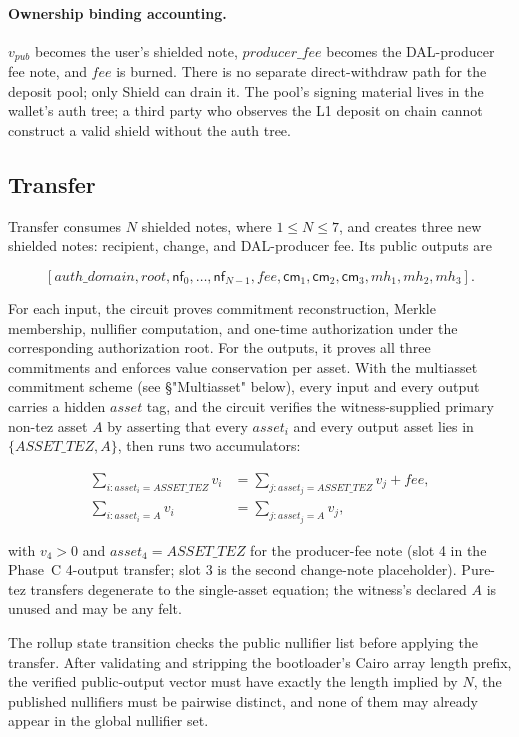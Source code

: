 \documentclass[11pt]{article}
\newcommand{\cm}{\mathsf{cm}}
\newcommand{\nf}{\mathsf{nf}}
\begin{document}
\paragraph{Ownership binding accounting.} \(v_{pub}\) becomes the user's
shielded note, \(producer\_fee\) becomes the DAL-producer fee note, and
\(fee\) is burned. There is no separate direct-withdraw path for the
deposit pool; only Shield can drain it. The pool's signing material
lives in the wallet's auth tree; a third party who observes the L1
deposit on chain cannot construct a valid shield without the auth tree.

\subsection{Transfer}

Transfer consumes \(N\) shielded notes, where \(1 \leq N \leq 7\), and creates
three new shielded notes: recipient, change, and DAL-producer fee. Its public
outputs are

\[
[auth\_domain, root, \nf_0, \ldots, \nf_{N-1}, fee,
 \cm_1, \cm_2, \cm_3, mh_1, mh_2, mh_3].
\]

For each input, the circuit proves commitment reconstruction, Merkle membership,
nullifier computation, and one-time authorization under the corresponding
authorization root. For the outputs, it proves all three commitments and
enforces value conservation per asset. With the multiasset commitment scheme
(see §"Multiasset" below), every input and every output carries a hidden
\(asset\) tag, and the circuit verifies the witness-supplied primary non-tez
asset \(A\) by asserting that every \(asset_i\) and every output asset lies
in \(\{ASSET\_TEZ, A\}\), then runs two accumulators:

\begin{align*}
\sum_{i : asset_i = ASSET\_TEZ} v_i &= \sum_{j : asset_j = ASSET\_TEZ} v_j + fee, \\
\sum_{i : asset_i = A} v_i &= \sum_{j : asset_j = A} v_j,
\end{align*}

with \(v_4 > 0\) and \(asset_4 = ASSET\_TEZ\) for the producer-fee note
(slot 4 in the Phase~C 4-output transfer; slot 3 is the second
change-note placeholder).
Pure-tez transfers degenerate to the single-asset equation; the witness's
declared \(A\) is unused and may be any felt.

The rollup state transition checks the public nullifier list before applying the
transfer. After validating and stripping the bootloader's Cairo array length
prefix, the verified public-output vector must have exactly the length implied by
\(N\), the published nullifiers must be pairwise distinct, and none of them may
already appear in the global nullifier set.
\end{document}
